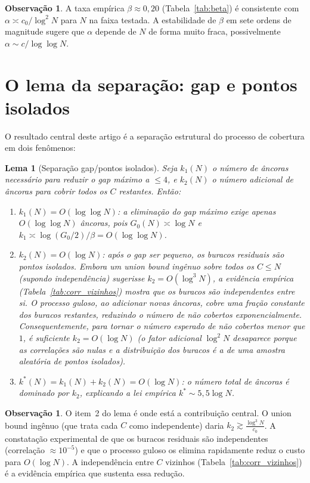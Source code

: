 \documentclass[11pt]{article}
\newtheorem{lemma}[theorem]{Lema}
\theoremstyle{definition}
\newtheorem{remark}[theorem]{Observação}
\begin{document}
	\begin{remark}
		A taxa empírica $\beta\approx 0{,}20$ (Tabela~\ref{tab:beta}) é consistente com $\alpha\asymp c_0/\log^2 N$ para $N$ na faixa testada. A estabilidade de $\beta$ em sete ordens de magnitude sugere que $\alpha$ depende de $N$ de forma muito fraca, possivelmente $\alpha\sim c/\log\log N$.
	\end{remark}
	
	\section{O lema da separação: gap e pontos isolados}
	
	O resultado central deste artigo é a separação estrutural do processo de cobertura em dois fenômenos:
	
	\begin{lemma}[Separação gap/pontos isolados]
		Seja $k_1(N)$ o número de âncoras necessário para reduzir o gap máximo a $\le 4$, e $k_2(N)$ o número adicional de âncoras para cobrir todos os $C$ restantes. Então:
		\begin{enumerate}
			\item $k_1(N) = O(\log\log N)$: a eliminação do gap máximo exige apenas $O(\log\log N)$ âncoras, pois $G_0(N)\asymp\log N$ e $k_1\asymp\log(G_0/2)/\beta = O(\log\log N)$.
			\item $k_2(N) = O(\log N)$: após o gap ser pequeno, os buracos residuais são pontos isolados. Embora um union bound ingênuo sobre todos os $C\le N$ (supondo independência) sugerisse $k_2 = O(\log^3 N)$, a evidência empírica (Tabela~\ref{tab:corr_vizinhos}) mostra que os buracos são independentes entre si. O processo guloso, ao adicionar novas âncoras, cobre uma fração constante dos buracos restantes, reduzindo o número de não cobertos exponencialmente. Consequentemente, para tornar o número esperado de não cobertos menor que $1$, é suficiente $k_2 = O(\log N)$ (o fator adicional $\log^2 N$ desaparece porque as correlações são nulas e a distribuição dos buracos é a de uma amostra aleatória de pontos isolados).
			\item $k^*(N) = k_1(N)+k_2(N) = O(\log N)$: o número total de âncoras é dominado por $k_2$, explicando a lei empírica $k^*\sim 5{,}5\log N$.
		\end{enumerate}
	\end{lemma}
	
	\begin{remark}
		O item~2 do lema é onde está a contribuição central. O union bound ingênuo (que trata cada $C$ como independente) daria $k_2 \gtrsim \frac{\log^3 N}{c_0}$. A constatação experimental de que os buracos residuais são independentes (correlação $\approx 10^{-5}$) e que o processo guloso os elimina rapidamente reduz o custo para $O(\log N)$. A independência entre $C$ vizinhos (Tabela~\ref{tab:corr_vizinhos}) é a evidência empírica que sustenta essa redução.
	\end{remark}
	
\end{document}
